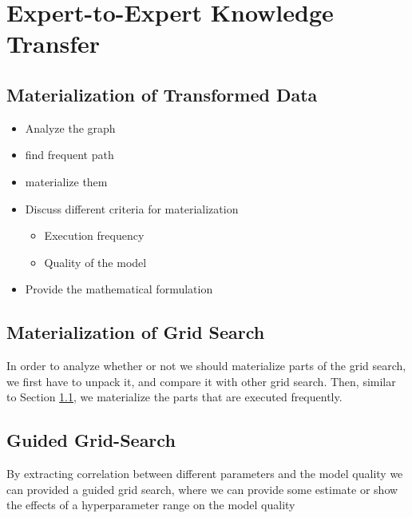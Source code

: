 \section{Expert-to-Expert Knowledge Transfer} \label{sec-expert-expert}


\subsection{Materialization of Transformed Data}\label{sub-sec-materialization-of-transformed-data}
\begin{itemize}
\item Analyze the graph
\item find frequent path 
\item materialize them
\item Discuss different criteria for materialization
	\begin{itemize} 
		\item Execution frequency 
		\item Quality of the model
	\end{itemize}
\item Provide the mathematical formulation
\end{itemize}


\subsection{Materialization of Grid Search}
In order to analyze whether or not we should materialize parts of the grid search, we first have to unpack it, and compare it with other grid search.
Then, similar to Section \ref{sub-sec-materialization-of-transformed-data}, we materialize the parts that are executed frequently.

\subsection{Guided Grid-Search}
By extracting correlation between different parameters and the model quality we can provided a guided grid search, where we can provide some estimate or show the effects of a hyperparameter range on the model quality